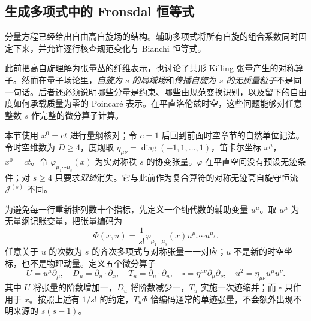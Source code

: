 \subsection{生成多项式中的 Fronsdal 恒等式}\label{sec:ghs-fronsdal-higher-spin}

分量方程已经给出自由高自旋场的结构。辅助多项式将所有自旋的组合系数同时固定下来，并允许逐行核查规范变化与 Bianchi 恒等式。

此前把高自旋理解为张量丛的纤维表示，也讨论了共形 Killing 张量产生的对称算子。然而在量子场论里，\emph{自旋为 $s$ 的局域场}和\emph{传播自旋为 $s$ 的无质量粒子}不是同一句话。后者还必须说明哪些分量是约束、哪些由规范变换识别，以及留下的自由度如何承载质量为零的 Poincar\'e 表示。在平直洛伦兹时空，这些问题能够对任意整数 $s$ 作完整的微分算子计算。

本节使用 $x^0=ct$ 进行量纲核对；令 $c=1$ 后回到前面时空章节的自然单位记法。令时空维数为 $D\ge4$，度规取 $\eta_{\mu\nu}=\operatorname{diag}(-1,1,\ldots,1)$，笛卡尔坐标 $x^\mu$，$x^0=ct$。令 $\varphi_{\mu_1\cdots\mu_s}(x)$ 为实对称秩 $s$ 的协变张量。$\varphi$ 在平直空间没有预设无迹条件；对 $s\ge4$ 只要求\emph{双迹}消失。它与此前作为复合算符的对称无迹高自旋守恒流 $\mathcal J^{(s)}$ 不同。

为避免每一行重新排列数十个指标，先定义一个纯代数的辅助变量 $u^\mu$。取 $u^\mu$ 为无量纲记账变量，把张量编码为
\begin{equation}\label{eq:ghs-r7-fronsdal-field-polynomial}
 \Phi(x,u)=\frac1{s!}\varphi_{\mu_1\cdots\mu_s}(x)
 u^{\mu_1}\cdots u^{\mu_s}.
\end{equation}
任意关于 $u$ 的次数为 $s$ 的齐次多项式与对称张量一一对应；$u$ 不是新的时空坐标，也不是物理动量。定义五个微分算子
\begin{equation}\label{eq:ghs-r7-fronsdal-operators}
 U=u^\mu\partial_\mu,\quad
 D_u=\partial_u\!\cdot\!\partial_x,\quad
 T_u=\partial_u\!\cdot\!\partial_u,\quad
 \square=\eta^{\mu\nu}\partial_\mu\partial_\nu,\quad
 u^2=\eta_{\mu\nu}u^\mu u^\nu.
\end{equation}
其中 $U$ 将张量的阶数增加一，$D_u$ 将阶数减少一，$T_u$ 实施一次迹缩并；而 $\square$ 只作用于 $x$。按照上述有 $1/s!$ 的约定，$T_u\Phi$ 恰编码通常的单迹张量，不会额外出现不明来源的 $s(s-1)$。

